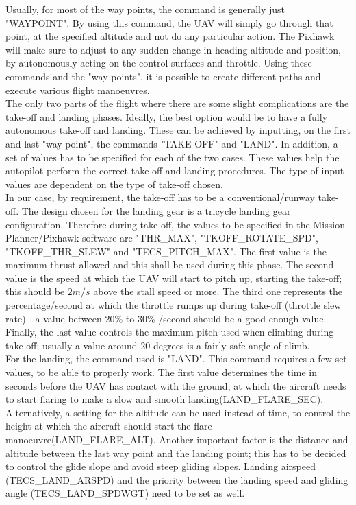 \documentclass[12pt]{article}
\begin{document}
\noindent Usually, for most of the way points, the command is generally just "WAYPOINT". By using this command, the UAV will simply go through that point, at the specified altitude and not do any particular action. The Pixhawk will make sure to adjust to any sudden change in heading altitude and position, by autonomously acting on the control surfaces and throttle. \cite{CONTROL5} Using these commands and the "way-points", it is possible to create different paths and execute various flight manoeuvres. \\

\noindent The only two parts of the flight where there are some slight complications are the take-off and landing phases. Ideally, the best option would be to have a fully autonomous take-off and landing. These can be achieved by inputting, on the first and last "way point", the commands "TAKE-OFF" and "LAND". In addition, a set of values has to be specified for each of the two cases. These values help the autopilot perform the correct take-off and landing procedures. The type of input values are dependent on the type of take-off chosen. \\

\noindent In our case, by requirement, the take-off has to be a conventional/runway take-off. The design chosen for the landing gear is a tricycle landing gear configuration. Therefore during take-off, the values to be specified in the Mission Planner/Pixhawk software are "THR\_MAX", "TKOFF\_ROTATE\_SPD", "TKOFF\_THR\_SLEW" and "TECS\_PITCH\_MAX". The first value is the maximum thrust allowed and this shall be used during this phase. The second value is the speed at which the UAV will start to pitch up, starting the take-off; this should be $2m/s$ above the stall speed or more. The third one represents the percentage/second at which the throttle rumps up during take-off (throttle slew rate) - a value between 20\% to 30\% /second should be a good enough value. Finally, the last value controls the maximum pitch used when climbing during take-off; usually a value around 20 degrees is a fairly safe angle of climb. \cite{CONTROL6} \\

\noindent For the landing, the command used is "LAND". This command requires a few set values, to be able to properly work. The first value determines the time in seconds before the UAV has contact with the ground, at which the aircraft needs to start flaring to make a slow and smooth landing(LAND\_FLARE\_SEC). Alternatively, a setting for the altitude can be used instead of time, to control the height at which the aircraft should start the flare manoeuvre(LAND\_FLARE\_ALT). Another important factor is the distance and altitude between the last way point and the landing point; this has to be decided to control the glide slope and avoid steep gliding slopes. Landing airspeed (TECS\_LAND\_ARSPD) and the priority between the landing speed and gliding angle (TECS\_LAND\_SPDWGT) need to be set as well. \cite{CONTROL7} \\
\end{document}
